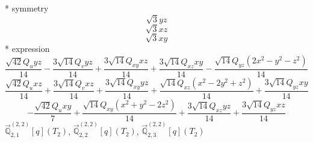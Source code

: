 \documentclass[fleqn,8pt]{jsarticle}
\begin{document}
\noindent\quad ** symmetry
\begin{dmath*}
\sqrt{3} y z
\end{dmath*}
\begin{dmath*}
\sqrt{3} x z
\end{dmath*}
\begin{dmath*}
\sqrt{3} x y
\end{dmath*}
\noindent\quad ** expression
\begin{dmath*}
\frac{\sqrt{42} Q_{u} y z}{14} - \frac{3 \sqrt{14} Q_{v} y z}{14} + \frac{3 \sqrt{14} Q_{xy} x z}{14} + \frac{3 \sqrt{14} Q_{xz} x y}{14} - \frac{\sqrt{14} Q_{yz} \left(2 x^{2} - y^{2} - z^{2}\right)}{14}
\end{dmath*}
\begin{dmath*}
\frac{\sqrt{42} Q_{u} x z}{14} + \frac{3 \sqrt{14} Q_{v} x z}{14} + \frac{3 \sqrt{14} Q_{xy} y z}{14} + \frac{\sqrt{14} Q_{xz} \left(x^{2} - 2 y^{2} + z^{2}\right)}{14} + \frac{3 \sqrt{14} Q_{yz} x y}{14}
\end{dmath*}
\begin{dmath*}
- \frac{\sqrt{42} Q_{u} x y}{7} + \frac{\sqrt{14} Q_{xy} \left(x^{2} + y^{2} - 2 z^{2}\right)}{14} + \frac{3 \sqrt{14} Q_{xz} y z}{14} + \frac{3 \sqrt{14} Q_{yz} x z}{14}
\end{dmath*}
\noindent\quad $\vec{\mathbb{Q}}_{2,1}^{(2,2)}[q](T_{2})$, $\vec{\mathbb{Q}}_{2,2}^{(2,2)}[q](T_{2})$, $\vec{\mathbb{Q}}_{2,3}^{(2,2)}[q](T_{2})$
\end{document}
